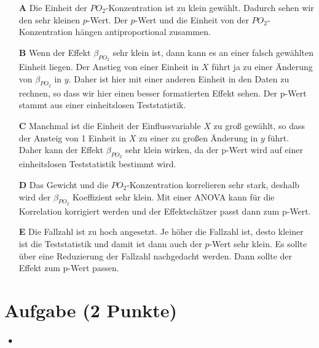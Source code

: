 \documentclass[a4paper, 9pt]{scrartcl}\usepackage[]{graphicx}\usepackage[]{xcolor}
\begin{document}
\begin{enumerate}
\item [\textbf{A} \msquare] Die Einheit der $PO_2$-Konzentration ist zu klein gewählt. Dadurch sehen wir den sehr kleinen $p$-Wert. Der $p$-Wert und die Einheit von der $PO_2$-Konzentration hängen antiproportional zusammen.
\item [\textbf{B} \msquare] Wenn der Effekt $\beta_{PO_2}$ sehr klein ist, dann kann es an einer falsch gewählten Einheit liegen. Der Anstieg von einer Einheit in $X$ führt ja zu einer Änderung von $\beta_{PO_2}$ in $y$. Daher ist hier mit einer anderen Einheit in den Daten zu rechnen, so dass wir hier einen besser formatierten Effekt sehen. Der p-Wert stammt aus einer einheitslosen Teststatistik.
\item [\textbf{C} \msquare] Manchmal ist die Einheit der Einflussvariable $X$ zu groß gewählt, so dass der Ansteig von 1 Einheit in $X$ zu einer zu großen Änderung in $y$ führt. Daher kann der Effekt $\beta_{PO_2}$ sehr klein wirken, da der p-Wert wird auf einer einheitslosen Teststatistik bestimmt wird.
\item [\textbf{D} \msquare] Das Gewicht und die $PO_2$-Konzentration korrelieren sehr stark, deshalb wird der $\beta_{PO_2}$ Koeffizient sehr klein. Mit einer ANOVA kann für die Korrelation korrigiert werden und der Effektschätzer passt dann zum p-Wert.
\item [\textbf{E} \msquare] Die Fallzahl ist zu hoch angesetzt. Je höher die Fallzahl ist, desto kleiner ist die Teststatistik und damit ist dann auch der $p$-Wert sehr klein. Es sollte über eine Reduzierung der Fallzahl nachgedacht werden. Dann sollte der Effekt zum p-Wert passen.
\end{enumerate}

\section{Aufgabe \hfill (2 Punkte)}

\ifcollection
\begin{flushright}
\tiny\vspace{-2Ex}
\textbf{\examinhaltstart}
\exammodulestatversuch $\;\bullet$
\exammodulebiostat
\vspace{-1Ex}
\end{flushright}
\fi
\end{document}
